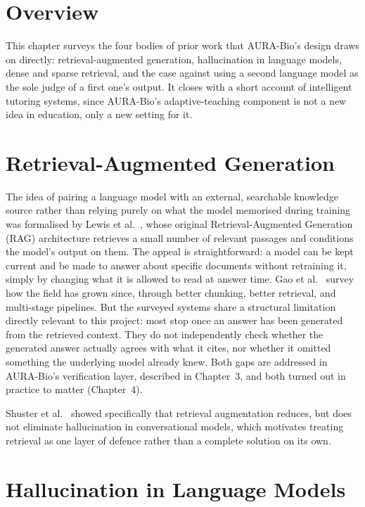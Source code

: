 \section{Overview}\label{2.1}

This chapter surveys the four bodies of prior work that AURA-Bio's design
draws on directly: retrieval-augmented generation, hallucination in
language models, dense and sparse retrieval, and the case against using a
second language model as the sole judge of a first one's output. It closes
with a short account of intelligent tutoring systems, since AURA-Bio's
adaptive-teaching component is not a new idea in education, only a new
setting for it.

\section{Retrieval-Augmented Generation}\label{2.2}

The idea of pairing a language model with an external, searchable knowledge
source rather than relying purely on what the model memorised during
training was formalised by Lewis et al.\ \cite{lewis2020rag}, whose original
Retrieval-Augmented Generation (RAG) architecture retrieves a small number
of relevant passages and conditions the model's output on them. The appeal
is straightforward: a model can be kept current and be made to answer
about specific documents without retraining it, simply by changing what it
is allowed to read at answer time. Gao et al.\ \cite{gao2023ragsurvey}
survey how the field has grown since, through better chunking, better
retrieval, and multi-stage pipelines. But the surveyed systems share a
structural limitation directly relevant to this project: most stop once an
answer has been generated from the retrieved context. They do not
independently check whether the generated answer actually agrees with what
it cites, nor whether it omitted something the underlying model already
knew. Both gaps are addressed in AURA-Bio's verification layer, described in
Chapter~3, and both turned out in practice to matter (Chapter~4).

Shuster et al.\ \cite{shuster2021retrieval} showed specifically that
retrieval augmentation reduces, but does not eliminate hallucination in
conversational models, which motivates treating retrieval as one layer of
defence rather than a complete solution on its own.

\section{Hallucination in Language Models}\label{2.3}

